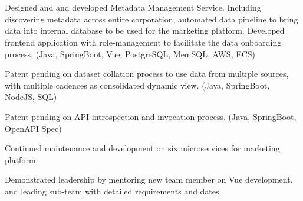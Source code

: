 \documentclass[letterpaper]{deedy-resume-openfont} %
\begin{document}

\newpage %

\begin{minipage}[t]{0.28\textwidth} %

\section{}

\end{minipage} %
\hfill
\begin{minipage}[t]{0.71\textwidth} %




\begin{tightemize}
\item Designed and and developed Metadata Management Service. Including discovering metadata across entire corporation, automated data pipeline to bring data into internal database to be used for the marketing platform. Developed frontend application with role-management to facilitate the data onboarding process. (Java, SpringBoot, Vue, PostgreSQL, MemSQL, AWS, ECS)
\item Patent pending on dataset collation process to use data from multiple sources, with multiple cadences as consolidated dynamic view. (Java, SpringBoot, NodeJS, SQL)
\item Patent pending on API introspection and invocation process. (Java, SpringBoot, OpenAPI Spec)
\item Continued maintenance and development on six microservices for marketing platform.
\item Demonstrated leadership by mentoring new team member on Vue development, and leading sub-team with detailed requirements and dates.
\end{tightemize}

\sectionsep %


\end{minipage}
\end{document}
